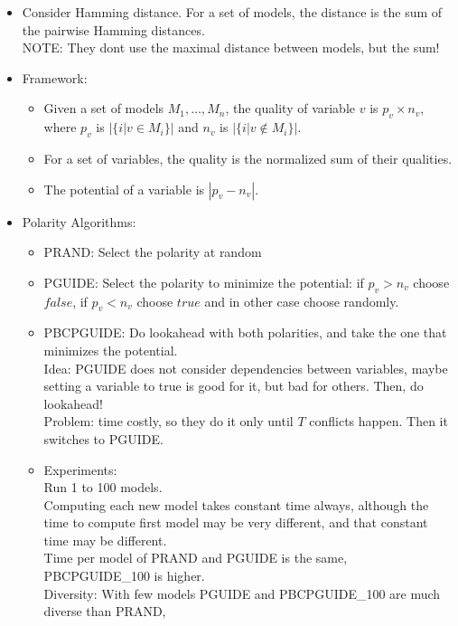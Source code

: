 \begin{itemize}
\begin{itemize}
    \end{itemize}
\item
    Consider Hamming distance.
    For a set of models, the distance is the sum of the pairwise Hamming distances.
    \\
    NOTE: They dont use the maximal distance between models, but the sum! 
\item
    Framework:
    \begin{itemize}
    \item
        Given a set of models $M_1,\ldots,M_n$, 
        the quality of variable $v$ is $p_v \times n_v$, 
        where $p_v$ is $|\{ i | v \in M_i \}|$ and $n_v$ is $|\{ i | v \notin M_i \}|$.
    \item
        For a set of variables, the quality is the normalized sum of their qualities.
    \item
        The potential of a variable is $|p_v - n_v|$.
    \end{itemize}
\item
    Polarity Algorithms:
    \begin{itemize}
    \item
        PRAND: Select the polarity at random
    \item
        PGUIDE: Select the polarity to minimize the potential: if $p_v > n_v$ choose $false$, 
        if $p_v < n_v$ choose $true$ and in other case choose randomly.
    \item
        PBCPGUIDE: Do lookahead with both polarities, and take the one that minimizes the potential.
        \\
        Idea: PGUIDE does not consider dependencies between variables, maybe setting a variable to true
        is good for it, but bad for others. Then, do lookahead!
        \\
        Problem: time costly, so they do it only until $T$ conflicts happen.
        Then it switches to PGUIDE.
    \item
        Experiments: 
        \\
        Run 1 to 100 models.
        \\
        Computing each new model takes constant time always,
        although the time to compute first model may be very different, 
        and that constant time may be different.
        \\
        Time per model of PRAND and PGUIDE is the same, PBCPGUIDE\_100 is higher.
        \\
        Diversity: With few models PGUIDE and PBCPGUIDE\_100 are much diverse than PRAND,

\end{itemize}
\end{itemize}
